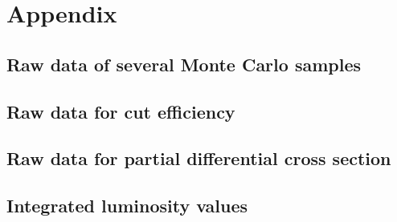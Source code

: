 \clearpage
\appendix
\section{Appendix}
\subsection{Raw data of several Monte Carlo samples}



	

\clearpage
\subsection{Raw data for cut efficiency}\label{app:59}


\clearpage
\subsection{Raw data for partial differential cross section}\label{app:510}


\subsection{Integrated luminosity values}

